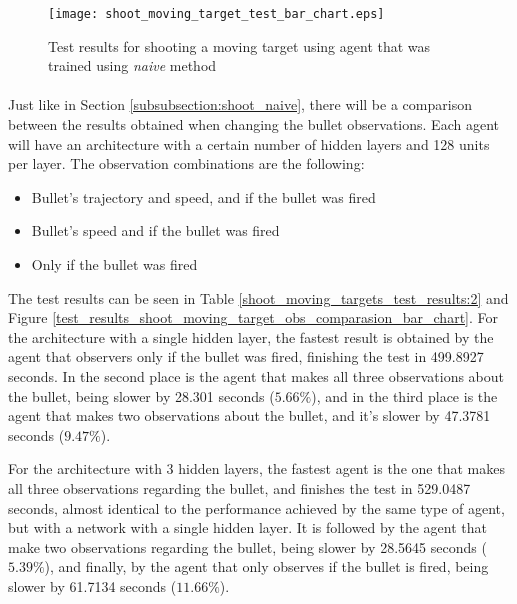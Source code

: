 \begin{figure}
    \begin{center}
        \texttt{[image: shoot\_moving\_target\_test\_bar\_chart.eps]}
        \caption{Test results for shooting a moving target using agent that was trained using \emph{naive} method}
        \label{test_results_shoot_moving_target_bar_chart}
    \end{center}
\end{figure}



\paragraph{}
Just like in Section \ref{subsubsection:shoot_naive}, there will be a comparison between the results obtained when changing the bullet observations. Each agent will have an architecture with a certain number of hidden layers and 128 units per layer. The observation combinations are the following:
\begin{itemize}
    \item Bullet's trajectory and speed, and if the bullet was fired
    \item Bullet's speed and if the bullet was fired
    \item Only if the bullet was fired
\end{itemize}

The test results can be seen in Table \ref{shoot_moving_targets_test_results:2} and Figure \ref{test_results_shoot_moving_target_obs_comparasion_bar_chart}. For the architecture with a single hidden layer, the fastest result is obtained by the agent that observers only if the bullet was fired, finishing the test in 499.8927 seconds. In the second place is the agent that makes all three observations about the bullet, being slower by 28.301 seconds ($5.66\%$), and in the third place is the agent that makes two observations about the bullet, and it's slower by 47.3781 seconds ($9.47\%$).

For the architecture with 3 hidden layers, the fastest agent is the one that makes all three observations regarding the bullet, and finishes the test in 529.0487 seconds, almost identical to the performance achieved by the same type of agent, but with a network with a single hidden layer. It is followed by the agent that make two observations regarding the bullet, being slower by 28.5645 seconds ($5.39\%$), and finally, by the agent that only observes if the bullet is fired, being slower by 61.7134 seconds ($11.66\%$).

